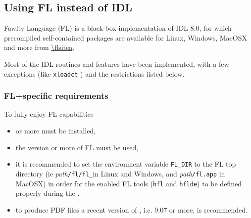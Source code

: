 \documentclass[12pt,twoside]{article}
\makeatletter
\newcommand{\nop}[1]{\Hy@raisedlink{\hypertarget{#1}{}}}
\newcommand{\mytarget}[1]{\nop{#1}}%
\newcommand{\mytarget}[1]{\label{#1}}
\makeatother
\begin{document}

\subsection{Using FL instead of IDL}
\label{sec:using_fl}
\label{install:using_fl}
\mytarget{install:using_fl}
Fawlty Language (FL) is a black-box implementation of IDL 8.0, for which precompiled self-contained packages
are available for Linux, Windows, MacOSX and more from 
\url{\flsitea}.

Most of the IDL routines and features have been implemented, with a few exceptions 
(like \texttt{xloadct}%
) and the restrictions listed below.

\subsubsection*{FL+\healpix specific requirements}
To fully enjoy FL capabilities
\begin{itemize}
\item \healpix \hpxversion{} or more must be installed,
%
\item the version \flversion or more of FL must be used,
%
\item it is recommended to set the environment variable \texttt{FL\_DIR} to the FL top directory (ie {\em path}\texttt{/fl/fl\_\flversion}in Linux and Windows, and {\em path}\texttt{/fl.app} in MacOSX) 
in order for the \healpix enabled FL tools (\texttt{hfl} and \texttt{hflde}) to be defined properly during the
.
%
\item to produce PDF files
a recent version of , i.e. 9.07 or more, is recommended.
%
\end{itemize}
\end{document}
